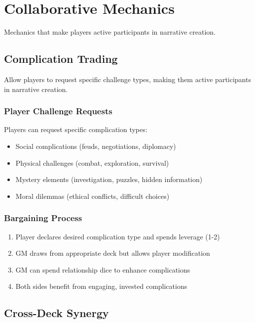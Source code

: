 \section{Collaborative Mechanics}

Mechanics that make players active participants in narrative creation.

\subsection{Complication Trading}

Allow players to request specific challenge types, making them active participants in narrative creation.

\subsubsection{Player Challenge Requests}

Players can request specific complication types:
\begin{itemize}
\item Social complications (feuds, negotiations, diplomacy)
\item Physical challenges (combat, exploration, survival)
\item Mystery elements (investigation, puzzles, hidden information)
\item Moral dilemmas (ethical conflicts, difficult choices)
\end{itemize}

\subsubsection{Bargaining Process}

\begin{enumerate}
\item Player declares desired complication type and spends leverage (1-2)
\item GM draws from appropriate deck but allows player modification
\item GM can spend relationship dice to enhance complications
\item Both sides benefit from engaging, invested complications
\end{enumerate}

\subsection{Cross-Deck Synergy}


